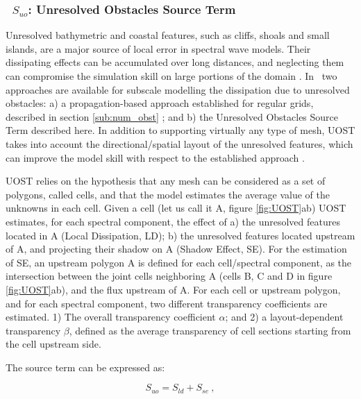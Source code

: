 \vsssub
\subsubsection{~$S_{uo}$: Unresolved Obstacles Source Term} \label{sec:UOST}
\vsssub


Unresolved bathymetric and coastal features, such as cliffs, shoals and small islands, 
are a major source of local error in spectral wave models. 
Their dissipating effects can be accumulated over long distances, and 
neglecting them can compromise the simulation skill on large portions of the domain 
\citep{tol:Waves01a,tol:WaF02,art:Tuomi2014,art:Mentaschi2015a}. 
In \ws\ 
two approaches are available for subscale modelling 
the dissipation due to unresolved obstacles: 
a) a propagation-based approach established for regular grids, described in section 
\ref{sub:num_obst} \citep{tol:OMOD03a, tol:OMOD08a}; and b) the 
Unresolved Obstacles Source Term \citep[UOST,][]{art:Mentaschi2018a,art:Mentaschi2015b}
described here.
In addition to supporting virtually any type of mesh, 
UOST takes into account the directional/spatial layout 
of the unresolved features, which can improve the model skill
with respect to the established approach \citep{art:HMM00,art:Mentaschi2018b}.

UOST relies on the hypothesis that any mesh can be considered as a set of polygons, 
called cells, and that the model estimates the average value of the unknowns 
in each cell. 
Given a cell (let us call it A, figure \ref{fig:UOST}ab) UOST estimates, for each spectral component, 
the effect of a) the unresolved features located in A (Local Dissipation, LD); 
b) the unresolved features located upstream of A, and projecting their shadow on A 
(Shadow Effect, SE). For the estimation of SE, 
an upstream polygon A\textsc{} is defined for each 
cell/spectral component, as the intersection between the joint cells neighboring A 
(cells B, C and D in figure \ref{fig:UOST}ab), and the flux upstream of A. 
For each cell or upstream polygon, and for each spectral component, 
two different transparency coefficients are estimated. 
1) The overall transparency coefficient $\alpha$; and 
2) a layout-dependent transparency $\beta$, defined as the average transparency 
of cell sections starting from the cell upstream side. 

The source term can be expressed as:

\begin{equation}
S_{uo} = S_{ld} + S_{se}\ ,
\end{equation}

